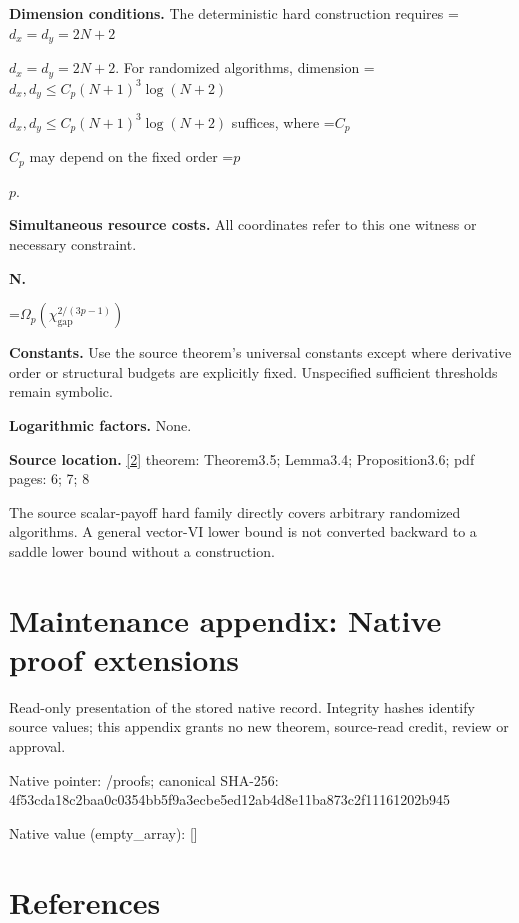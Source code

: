 \documentclass[10pt,a4paper]{article}
\newcommand{\AtlasMath}[1]{\par\begingroup\centering\setbox0=\hbox{$\displaystyle #1$}\ifdim\wd0>1.4\linewidth\typeout{ATLAS WIDE FORMULA: \the\wd0}\fi\ifdim\wd0>\linewidth\resizebox{\linewidth}{!}{\box0}\else\box0\fi\par\endgroup}
\newcommand{\AtlasInlineMath}[1]{\begingroup\setbox0=\hbox{$#1$}\ifdim\wd0>.4\linewidth\endgroup\AtlasMath{#1}\else\endgroup$#1$\fi}
\begin{document}
\textbf{Dimension conditions.} The deterministic hard construction requires \AtlasInlineMath{d_x=d_y=2N+2}. For randomized algorithms, dimension \AtlasInlineMath{d_x,d_y\le C_p(N+1)^3\log(N+2)} suffices, where \AtlasInlineMath{C_p} may depend on the fixed order \AtlasInlineMath{p}.



\textbf{Simultaneous resource costs.} All coordinates refer to this one witness or necessary constraint.



\textbf{N.}



\AtlasMath{\Omega_p(\chi_{\mathrm{gap}}^{2/(3p-1)})}


\textbf{Constants.} Use the source theorem’s universal constants except where derivative order or structural budgets are explicitly fixed. Unspecified sufficient thresholds remain symbolic.



\textbf{Logarithmic factors.} None.



\textbf{Source location.} \href{https://arxiv.org/pdf/2609.28246v2}{[2]} theorem: Theorem3.5; Lemma3.4; Proposition3.6; pdf pages: 6; 7; 8



The source scalar-payoff hard family directly covers arbitrary randomized algorithms. A general vector-VI lower bound is not converted backward to a saddle lower bound without a construction.



\section{Maintenance appendix: Native proof extensions}


Read-only presentation of the stored native record. Integrity hashes identify source values; this appendix grants no new theorem, source-read credit, review or approval.



Native pointer: /proofs; canonical SHA-256: 4f53cda18c2baa0c0354bb5f\allowbreak{}9a3ecbe5ed12ab4d8e11ba87\allowbreak{}3c2f11161202b945



Native value (empty\_array): []



\section{References}
\end{document}
